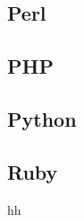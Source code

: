\documentclass{KodeBook}
\begin{document}

\subsection{Perl}


\subsection{PHP}


\subsection{Python}


\subsection{Ruby}

hh




\ifx\wholebook\relax\else
% 
% 
	
\end{document}
